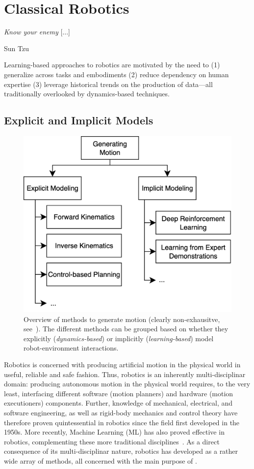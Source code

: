\section{Classical Robotics}
\label{sec:classical}

\epigraph{\textit{Know your enemy} [...]}{Sun Tzu}

\begin{tldr}
Learning-based approaches to robotics are motivated by the need to (1) generalize across tasks and embodiments (2) reduce dependency on human expertise (3) leverage historical trends on the production of data---all traditionally overlooked by dynamics-based techniques.
\end{tldr}

\subsection{Explicit and Implicit Models}

\begin{figure}
    \centering
    \includegraphics[width=0.5\linewidth]{figures/ch2/ch2-approaches.pdf}
    \caption{Overview of methods to generate motion (clearly non-exhausitve, see~\citet{bekrisStateRobotMotion2024}). The different methods can be grouped based on whether they explicitly (\emph{dynamics-based}) or implicitly (\emph{learning-based}) model robot-environment interactions.}
    \label{fig:generating-motion-atlas}
\end{figure}

Robotics is concerned with producing artificial motion in the physical world in useful, reliable and safe fashion.
Thus, robotics is an inherently multi-disciplinar domain: producing autonomous motion in the physical world requires, to the very least, interfacing different software (motion planners) and hardware (motion executioners) components.
Further, knowledge of mechanical, electrical, and software engineering, as well as rigid-body mechanics and control theory have therefore proven quintessential in robotics since the field first developed in the 1950s.
More recently, Machine Learning (ML) has also proved effective in robotics, complementing these more traditional disciplines~\citep{connellRobotLearning1993}.
As a direct consequence of its multi-disciplinar nature, robotics has developed as a rather wide array of methods, all concerned with the main purpose of .


